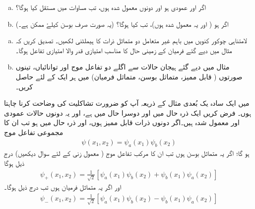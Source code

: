 \begin{enumerate}[a.]
\item
اگر  اور   عمودی ہو اور دونوں معمول شدہ ہوں،  تب مساوات    میں مستقل  کیا ہوگا؟ 
\item
اگر   ہو ( اور یہ معمول شدہ ہوں)،   تب    کیا ہوگا؟ (یہ صورت صرف بوسن کیلۓ ممکن ہے۔)
\end{enumerate}
\begin{enumerate}[a.]
\item
لامتناہی چوکور کنویں  میں باہم غیر متعامل دو متماثل ذرات کا ہیملٹنی لکھیں۔ تصدیق کریں کہ مثال    میں دیے گئے  فرمیان کے زمینی حال   کا مناسب امتیازی قدر والا امتیازی تفاعل ہوگا۔ 
\item
مثال    میں دیے گئے ہیجان حالات سے اگلے دو  تفاعل موج اور توانائیاں،  تینوں صورتوں ( قابل ممیز، متماثل بوسن، متماثل فرمیان)   میں ہر ایک کے لئے  حاصل کریں۔
\end{enumerate}


میں ایک سادہ یک بُعدی مثال کے ذریعہ آپ کو ضرورت تشاکلیت کی وضاحت کرنا چاہتا ہوں۔ فرض کریں ایک  ذرہ حال  میں اور دوسرا حال  میں ہے،   اور یہ دونوں حالات عمودی اور معمول شدہ  ہیں۔اگر  دونوں  ذرات قابل ممیز ہوں،  اور ذرہ  حال  میں ہو تب ان کا مجموعی تفاعل موج
\begin{align}\label{مساوات_متماثل_مجموعی_تفاعل_موج_قابل_ممیز}
	\psi(x_1, x_2)=\psi_a(x_1)\psi_b(x_2)
\end{align}
ہو گا؛ اگر یہ متماثل بوسن ہوں تب ان کا مرکب تفاعل موج ( معمول زنی کے لئے   سوال   دیکھیں)  درج ذیل ہوگا
\begin{align}\label{مساوات_متماثل_مجموعی_تفاعل_موج_متماثل_بوسن}
	\psi_+(x_1, x_2) = \frac{1}{\sqrt{2}}[\psi_a(x_1)\psi_b(x_2)+\psi_b(x_1)\psi_a(x_2)]
\end{align}
اور اگر یہ متماثل فرمیان ہوں تب درج ذیل ہوگا۔
\begin{align}\label{مساوات_متماثل_مجموعی_تفاعل_موج_متماثل_فرمیان}
	\psi_-(x_1, x_2)=\frac{1}{\sqrt{2}}[\psi_a(x_1)\psi_b(x_2)-\psi_b(x_1)\psi_a(x_2)]
\end{align}

